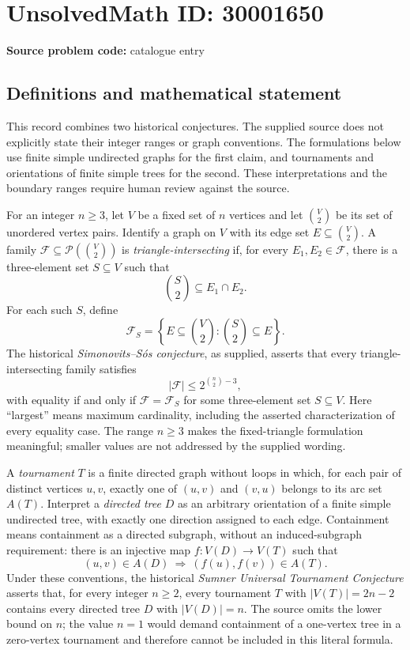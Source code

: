 \documentclass[11pt]{article}
\begin{document}
\section*{UnsolvedMath ID: 30001650}
\textbf{Source problem code:} catalogue entry
\subsection{Definitions and mathematical statement}
This record combines two historical conjectures. The supplied source does not explicitly state their integer ranges or graph conventions. The formulations below use finite simple undirected graphs for the first claim, and tournaments and orientations of finite simple trees for the second. These interpretations and the boundary ranges require human review against the source.

For an integer \(n\geq 3\), let \(V\) be a fixed set of \(n\) vertices and let \(\binom{V}{2}\) be its set of unordered vertex pairs. Identify a graph on \(V\) with its edge set \(E\subseteq\binom{V}{2}\). A family \(\mathcal{F}\subseteq\mathcal{P}(\binom{V}{2})\) is \emph{triangle-intersecting} if, for every \(E_1,E_2\in\mathcal{F}\), there is a three-element set \(S\subseteq V\) such that
\[
\binom{S}{2}\subseteq E_1\cap E_2.
\]
For each such \(S\), define
\[
\mathcal{F}_S=\left\{E\subseteq\binom{V}{2}:\binom{S}{2}\subseteq E\right\}.
\]
The historical \emph{Simonovits--S\'os conjecture}, as supplied, asserts that every triangle-intersecting family satisfies
\[
|\mathcal{F}|\leq 2^{\binom{n}{2}-3},
\]
with equality if and only if \(\mathcal{F}=\mathcal{F}_S\) for some three-element set \(S\subseteq V\). Here ``largest'' means maximum cardinality, including the asserted characterization of every equality case. The range \(n\geq3\) makes the fixed-triangle formulation meaningful; smaller values are not addressed by the supplied wording.

A \emph{tournament} \(T\) is a finite directed graph without loops in which, for each pair of distinct vertices \(u,v\), exactly one of \((u,v)\) and \((v,u)\) belongs to its arc set \(A(T)\). Interpret a \emph{directed tree} \(D\) as an arbitrary orientation of a finite simple undirected tree, with exactly one direction assigned to each edge. Containment means containment as a directed subgraph, without an induced-subgraph requirement: there is an injective map \(f:V(D)\to V(T)\) such that
\[
(u,v)\in A(D)\ \Longrightarrow\ (f(u),f(v))\in A(T).
\]
Under these conventions, the historical \emph{Sumner Universal Tournament Conjecture} asserts that, for every integer \(n\geq2\), every tournament \(T\) with \(|V(T)|=2n-2\) contains every directed tree \(D\) with \(|V(D)|=n\). The source omits the lower bound on \(n\); the value \(n=1\) would demand containment of a one-vertex tree in a zero-vertex tournament and therefore cannot be included in this literal formula.
\end{document}
